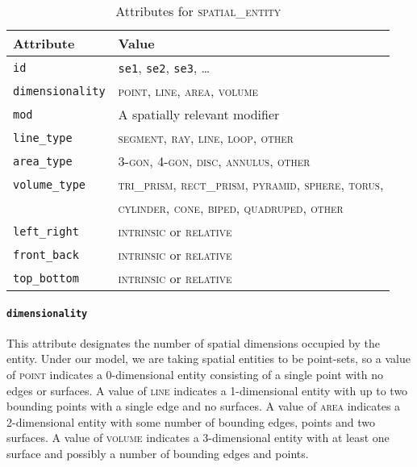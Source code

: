 \documentclass[11pt]{article}
\newenvironment{attributes}
{
\begin{tabular}{|l|l|}
    \hline \textbf{Attribute} & \textbf{Value}\\
}
{   \hline
\end{tabular}
}
\begin{document}
\begin{table}[h]
\centering
\begin{attributes}
    \hline \texttt{id}                  & \texttt{se1}, \texttt{se2}, 
                                          \texttt{se3}, \ldots\\
    \hline \texttt{dimensionality}      & \textsc{point}, \textsc{line}, \textsc{area}, \textsc{volume}\\
    \hline \texttt{mod}                 & A spatially relevant modifier\\
    \hline \texttt{line\_type}          & \textsc{segment}, \textsc{ray}, \textsc{line}, \textsc{loop}, \textsc{other}\\
    \hline \texttt{area\_type}          & \textsc{3-gon}, \textsc{4-gon}, \textsc{disc}, \textsc{annulus}, \textsc{other}\\
    \hline \texttt{volume\_type}        & \textsc{tri\_prism}, \textsc{rect\_prism}, \textsc{pyramid}, \textsc{sphere}, \textsc{torus},\\
                                        & \textsc{cylinder}, \textsc{cone}, \textsc{biped}, \textsc{quadruped}, \textsc{other}\\
    \hline \texttt{left\_right}         & \textsc{intrinsic} or \textsc{relative}\\
    \hline \texttt{front\_back}         & \textsc{intrinsic} or \textsc{relative}\\
    \hline \texttt{top\_bottom}         & \textsc{intrinsic} or \textsc{relative}\\
\end{attributes}
\caption{Attributes for \textsc{spatial\_entity}}
\label{tab:spatial_entity}
\end{table}

\paragraph{\texttt{dimensionality}} %
\label{par:dimensionality}
This attribute designates the number of spatial dimensions occupied by the entity. Under our model, we are taking spatial entities to be point-sets, so a value of \textsc{point} indicates a 0-dimensional entity consisting of a single point with no edges or surfaces. A value of \textsc{line} indicates a 1-dimensional entity with up to two bounding points with a single edge and no surfaces. A value of \textsc{area} indicates a 2-dimensional entity with some number of bounding edges, points and two surfaces. A value of \textsc{volume} indicates a 3-dimensional entity with at least one surface and possibly a number of bounding edges and points.
\end{document}
